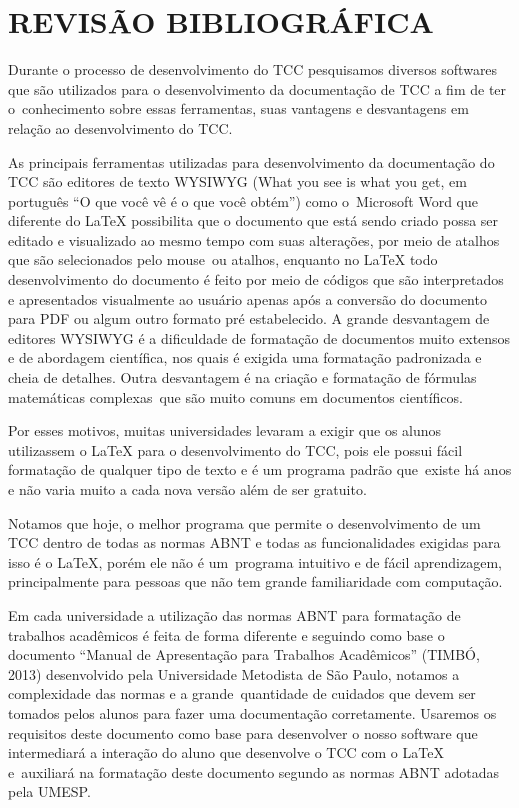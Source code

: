 \chapter{REVIS\~AO BIBLIOGR\'AFICA}

\bigskip

{
Durante o processo de desenvolvimento do TCC pesquisamos diversos softwares que s\~ao utilizados para o desenvolvimento
da documenta\c{c}\~ao de TCC a fim de ter o\ conhecimento sobre essas ferramentas, suas vantagens e desvantagens em
rela\c{c}\~ao ao desenvolvimento do TCC.}

{
As principais ferramentas utilizadas para desenvolvimento da documenta\c{c}\~ao do TCC s\~ao editores de texto WYSIWYG
(What you see is what you get, em portugu\^es ``O que voc\^e v\^e \'e o que voc\^e obt\'em'') como o~Microsoft Word que
diferente do {\LaTeX} possibilita que o documento que est\'a sendo criado possa ser editado e visualizado ao mesmo
tempo com suas altera\c{c}\~oes, por meio de atalhos que s\~ao selecionados pelo mouse\ ou atalhos, enquanto no
{\LaTeX} todo desenvolvimento do documento \'e feito por meio de c\'odigos que s\~ao interpretados e apresentados
visualmente ao usu\'ario apenas ap\'os a convers\~ao do documento para PDF ou algum outro formato pr\'e estabelecido. A
grande desvantagem de editores WYSIWYG \'e a dificuldade de formata\c{c}\~ao de documentos muito extensos e de
abordagem cient\'ifica, nos quais \'e exigida uma formata\c{c}\~ao padronizada e cheia de detalhes. Outra desvantagem
\'e na cria\c{c}\~ao e formata\c{c}\~ao de f\'ormulas matem\'aticas complexas\ que s\~ao muito comuns em documentos
cient\'ificos.}

{
Por esses motivos, muitas universidades levaram a exigir que os alunos utilizassem o {\LaTeX} para o desenvolvimento do
TCC, pois ele possui f\'acil formata\c{c}\~ao de qualquer tipo de texto e \'e um programa padr\~ao que\ existe h\'a
anos e n\~ao varia muito a cada nova vers\~ao al\'em de ser gratuito.}

{
Notamos que hoje, o melhor programa que permite o desenvolvimento de um TCC dentro de todas as normas ABNT e todas as
funcionalidades exigidas para isso \'e o {\LaTeX}, por\'em ele n\~ao \'e um\ programa intuitivo e de f\'acil
aprendizagem, principalmente para pessoas que n\~ao tem grande familiaridade com computa\c{c}\~ao.}

{
Em cada universidade a utiliza\c{c}\~ao das normas ABNT para formata\c{c}\~ao de trabalhos acad\^emicos \'e feita de
forma diferente e seguindo como base o documento ``Manual de Apresenta\c{c}\~ao para Trabalhos Acad\^emicos'' (TIMB\'O,
2013) desenvolvido pela Universidade Metodista de S\~ao Paulo, notamos a complexidade das normas e a grande\ quantidade
de cuidados que devem ser tomados pelos alunos para fazer uma documenta\c{c}\~ao corretamente. Usaremos os requisitos
deste documento como base para desenvolver o nosso software que intermediar\'a a intera\c{c}\~ao do aluno que
desenvolve o TCC com o {\LaTeX} e\ auxiliar\'a na formata\c{c}\~ao deste documento segundo as normas ABNT adotadas pela
UMESP.}

